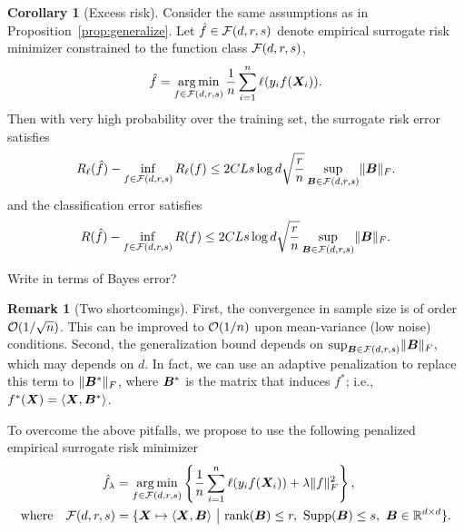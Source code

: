 \documentclass[11pt]{article}
\theoremstyle{definition}
\newtheorem{cor}[thm]{Corollary}
\newtheorem{rmk}{Remark}
\begin{document}
\begin{cor}[Excess risk]\label{cor:riskerror}
Consider the same assumptions as in Proposition~\ref{prop:generalize}. Let $\hat f\in\mathcal{F}(d,r,s)$ denote empirical surrogate risk minimizer constrained to the function class $\mathcal{F}(d,r,s)$, 
\[
 \hat f =\operatorname*{arg\,min}_{f\in\mathcal{F}(d,r,s)}{1\over n}\sum_{i=1}^n \ell(y_i f(\bm X_i)).
\]
Then with very high probability over the training set, the surrogate risk error satisfies
\[
R_\ell(\hat f)-\inf_{f\in\mathcal{F}(d,r,s)}R_\ell(f)\leq 2CL s\log d \sqrt{r\over n}  \sup_{\bm B\in\mathcal{F}(d,r,s)}\lVert\bm B\rVert_F.
\]
and the classification error satisfies
\[
R(\hat f)-\inf_{f\in\mathcal{F}(d,r,s)}R(f)\leq 2CL s\log d  \sqrt{r\over n} \sup_{\bm B\in\mathcal{F}(d,r,s)}\lVert\bm B\rVert_F.
\]
\end{cor}
{\color{red} Write in terms of Bayes error?}

\begin{rmk}[Two shortcomings] First, the convergence in sample size is of order $\mathcal{O}(1/\sqrt{n})$. This can be improved to $\mathcal{O}(1/n)$ upon mean-variance (low noise) conditions. Second, the generalization bound depends on $\sup_{\bm B\in\mathcal{F}(d,r,s)}\lVert\bm B\rVert_F$, which may depends on $d$. In fact, we can use an adaptive penalization to replace this term to $\lVert\bm B^*\rVert_F$, where $\bm B^*$ is the matrix that induces $f^*$; i.e., $f^*(\bm X)=\langle \bm X, \bm B^*\rangle$. 
\end{rmk}

To overcome the above pitfalls, we propose to use the following penalized empirical surrogate risk minimizer
\begin{align}\label{eq:est}
\hat f_\lambda &=  \argmin_{f\in\tF(d,r,s)} \left\{ {1\over n}\sum_{i=1}^n \ell(y_i f(\mX_i))+\lambda \FnormSize{}{f}^2\right\}, \\
\text{where}\quad \tF(d, r,s)&=\{\mX\mapsto \langle \mX, \mB\rangle\ \big| \ \text{rank}(\mB)\leq r, \ \text{Supp}(\mB)\leq s,\ \mB \in\mathbb{R}^{d\times d}\}.
\end{align}
\end{document}
